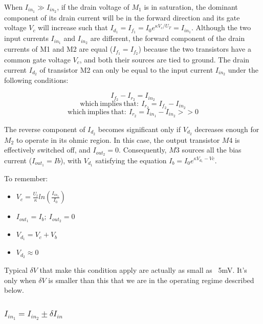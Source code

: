 When $I_{in_1} \gg I_{in_2}$, if the drain voltage of $M_1$ is in saturation, the dominant component of its drain current will be in the forward direction and its gate voltage $V_c$ will increase such that $I_d_1 = I_f_1 = I_0e^{\kappa V_c/U_T} = I_{in_1}$.  Although the two input currents $I_{in_1}$ and $I_{in_2}$ are different, the forward component of the drain currents of M1 and M2 are equal ($I_{f_1}= I_{f_2}$) because the two transistors
have a common gate voltage $V_c$, and both their sources are tied to ground. The drain current $I_d_2$ of transistor M2 can only be equal to the input current $I_{in_2}$ under the following conditions:

\begin{equation}
    I_f_2 - I_r_2 = I_{in_2}
\end{equation}
\begin{equation}
    \mathrm{which \ implies \ that: \ }I_r_2 = I_f_2 - I_{in_2}
\end{equation}
\begin{equation}
    \mathrm{which \ implies \ that: \ }I_r_2 = I_{in_1} - I_{in_2} >> 0
\end{equation}

The reverse component of $I_d_2$ becomes significant only if $V_d_2$ decreases
enough for $M_2$ to operate in its ohmic region. In this case, the output transistor $M4$ is effectively switched off, and $I_{out_2} = 0$. Consequently,
$M3$ sources all the bias current ($I_{out_1} = Ib$), with $V_d_1$ satisfying the equation $I_b = I_0e^{\kappa V_d_1 - Vc}$. 

To remember: 

\begin{itemize}
    \item $V_c = \frac{U_t}{\kappa}ln(\frac{I_{in}_1}{I_0})$
    \item $I_{out}_1 = I_b; \ I_{out}_2 = 0$
    \item $V_d_1 = V_c + V_b$
    \item $V_d_2 \approx 0$
\end{itemize}

Typical $\delta V$ that make this condition apply are actually as small as ~5mV. It's only when $\delta V$ is smaller than this that we are in the operating regime described below.  

\subsubsection{$I_{in_1} = I_{in_2} \pm \delta I_{in}$}


